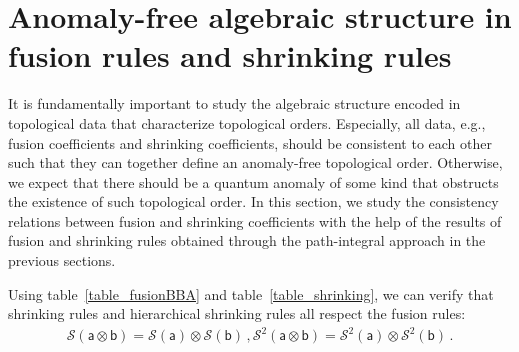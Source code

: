 \documentclass[11pt,nofootinbib,preprint]{revtex4-1}
\begin{document}
\section{Anomaly-free algebraic structure in fusion rules and shrinking rules}\label{section_algebraic}

It is fundamentally important to study the algebraic structure encoded in topological data that characterize topological orders. Especially, all data, e.g., fusion coefficients and shrinking coefficients, should be consistent to each other such that they can together define an anomaly-free topological order. Otherwise, we expect that there should be a quantum anomaly of some kind that obstructs the existence of such topological order. In this section, we study the consistency relations between fusion and shrinking coefficients with the help of the results of fusion and shrinking rules obtained through the path-integral approach in the previous sections. 


Using table~\ref{table_fusionBBA} and table~\ref{table_shrinking}, we can verify that shrinking rules and hierarchical shrinking rules all respect the fusion rules:
\begin{gather}
	\mathcal{S} \left( \mathsf{a}\otimes \mathsf{b} \right) =\mathcal{S} \left( \mathsf{a} \right) \otimes \mathcal{S} \left( \mathsf{b} \right) \,,
	\mathcal{S}^2 \left( \mathsf{a}\otimes \mathsf{b} \right) =\mathcal{S}^2 \left( \mathsf{a} \right) \otimes \mathcal{S}^2 \left( \mathsf{b} \right)\,.
	\label{eq19}
\end{gather}
\end{document}
